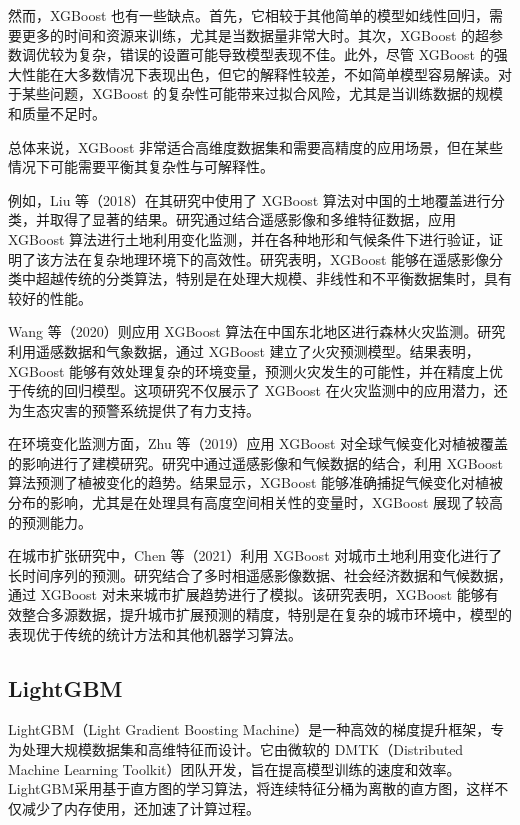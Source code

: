 \documentclass[AutoFakeBold]{LZUThesis-PgD&PhD}
\begin{document}
	然而，XGBoost 也有一些缺点。首先，它相较于其他简单的模型如线性回归，需要更多的时间和资源来训练，尤其是当数据量非常大时。其次，XGBoost 的超参数调优较为复杂，错误的设置可能导致模型表现不佳。此外，尽管 XGBoost 的强大性能在大多数情况下表现出色，但它的解释性较差，不如简单模型容易解读。对于某些问题，XGBoost 的复杂性可能带来过拟合风险，尤其是当训练数据的规模和质量不足时。
	
	总体来说，XGBoost 非常适合高维度数据集和需要高精度的应用场景，但在某些情况下可能需要平衡其复杂性与可解释性。
	
	例如，Liu 等（2018）在其研究中使用了 XGBoost 算法对中国的土地覆盖进行分类，并取得了显著的结果\cite{liu2018}。研究通过结合遥感影像和多维特征数据，应用 XGBoost 算法进行土地利用变化监测，并在各种地形和气候条件下进行验证，证明了该方法在复杂地理环境下的高效性。研究表明，XGBoost 能够在遥感影像分类中超越传统的分类算法，特别是在处理大规模、非线性和不平衡数据集时，具有较好的性能。
	
	Wang 等（2020）则应用 XGBoost 算法在中国东北地区进行森林火灾监测\cite{wang2020Y}。研究利用遥感数据和气象数据，通过 XGBoost 建立了火灾预测模型。结果表明，XGBoost 能够有效处理复杂的环境变量，预测火灾发生的可能性，并在精度上优于传统的回归模型。这项研究不仅展示了 XGBoost 在火灾监测中的应用潜力，还为生态灾害的预警系统提供了有力支持。
	
	在环境变化监测方面，Zhu 等（2019）应用 XGBoost 对全球气候变化对植被覆盖的影响进行了建模研究\cite{zhu2019}。研究中通过遥感影像和气候数据的结合，利用 XGBoost 算法预测了植被变化的趋势。结果显示，XGBoost 能够准确捕捉气候变化对植被分布的影响，尤其是在处理具有高度空间相关性的变量时，XGBoost 展现了较高的预测能力。
	
	在城市扩张研究中，Chen 等（2021）利用 XGBoost 对城市土地利用变化进行了长时间序列的预测\cite{chen2021}。研究结合了多时相遥感影像数据、社会经济数据和气候数据，通过 XGBoost 对未来城市扩展趋势进行了模拟。该研究表明，XGBoost 能够有效整合多源数据，提升城市扩展预测的精度，特别是在复杂的城市环境中，模型的表现优于传统的统计方法和其他机器学习算法。
	
	
	
	\subsection{LightGBM}
	LightGBM（Light Gradient Boosting Machine）是一种高效的梯度提升框架，专为处理大规模数据集和高维特征而设计。它由微软的 DMTK（Distributed Machine Learning Toolkit）团队开发，旨在提高模型训练的速度和效率。LightGBM采用基于直方图的学习算法，将连续特征分桶为离散的直方图，这样不仅减少了内存使用，还加速了计算过程。
	
\end{document}
